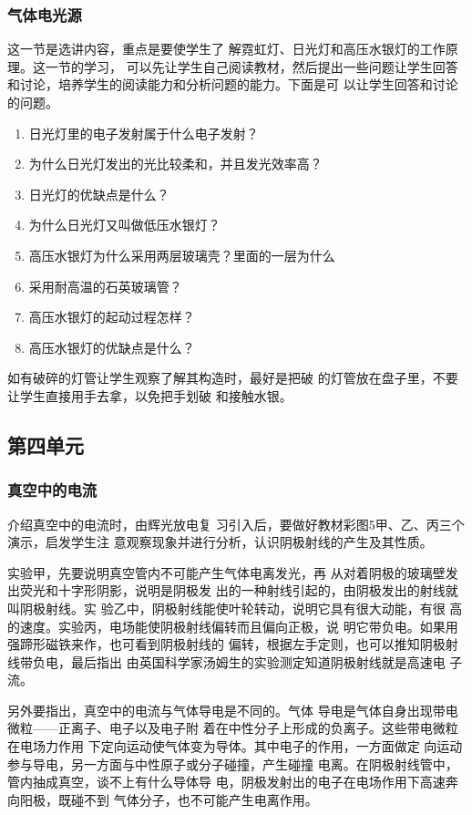 \subsubsection{气体电光源}

这一节是选讲内容，重点是要使学生了
解霓虹灯、日光灯和高压水银灯的工作原理。这一节的学习，
可以先让学生自己阅读教材，然后提出一些问题让学生回答
和讨论，培养学生的阅读能力和分析问题的能力。下面是可
以让学生回答和讨论的问题。
\begin{enumerate}
\item 日光灯里的电子发射属于什么电子发射？
\item 为什么日光灯发出的光比较柔和，并且发光效率高？
\item 日光灯的优缺点是什么？
\item 为什么日光灯又叫做低压水银灯？
\item 高压水银灯为什么采用两层玻璃壳？里面的一层为什么
\item 采用耐高温的石英玻璃管？
\item 高压水银灯的起动过程怎样？
\item 高压水银灯的优缺点是什么？
\end{enumerate}

如有破碎的灯管让学生观察了解其构造时，最好是把破
的灯管放在盘子里，不要让学生直接用手去拿，以免把手划破
和接触水银。

\subsection{第四单元}
\subsubsection{真空中的电流}

介绍真空中的电流时，由辉光放电复
习引入后，要做好教材彩图5甲、乙、丙三个演示，启发学生注
意观察现象并进行分析，认识阴极射线的产生及其性质。

实验甲，先要说明真空管内不可能产生气体电离发光，再
从对着阴极的玻璃壁发出荧光和十字形阴影，说明是阴极发
出的一种射线引起的，由阴极发出的射线就叫阴极射线。实
验乙中，阴极射线能使叶轮转动，说明它具有很大动能，有很
高的速度。实验丙，电场能使阴极射线偏转而且偏向正极，说
明它带负电。如果用强蹄形磁铁来作，也可看到阴极射线的
偏转，根据左手定则，也可以推知阴极射线带负电，最后指出
由英国科学家汤姆生的实验测定知道阴极射线就是高速电
子流。

另外要指出，真空中的电流与气体导电是不同的。气体
导电是气体自身出现带电微粒——正离子、电子以及电子附
着在中性分子上形成的负离子。这些带电微粒在电场力作用
下定向运动使气体变为导体。其中电子的作用，一方面做定
向运动参与导电，另一方面与中性原子或分子碰撞，产生碰撞
电离。在阴极射线管中，管内抽成真空，谈不上有什么导体导
电，阴极发射出的电子在电场作用下高速奔向阳极，既碰不到
气体分子，也不可能产生电离作用。

